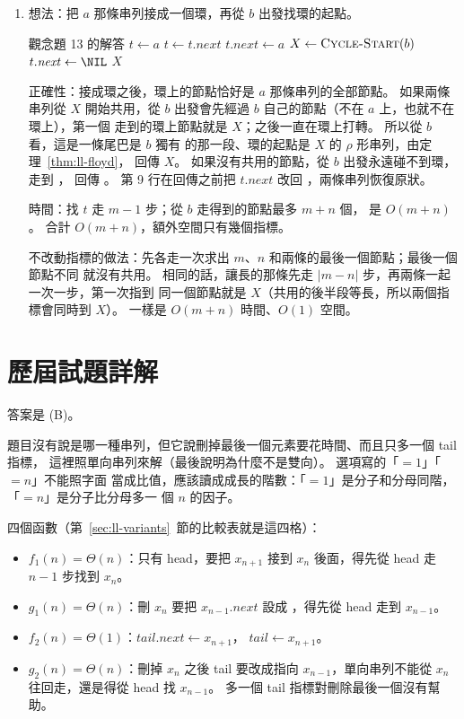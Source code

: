 \begin{enumerate}
\item 想法：把 $a$ 那條串列接成一個環，再從 $b$ 出發找環的起點。
\begin{pseudo}{觀念題 13 的解答}
        \State \Return \NIL
    \EndIf
    \State $t \gets a$
     
        \State $t \gets t.\mathit{next}$
    \EndWhile
    \State $t.\mathit{next} \gets a$ 
    \State $X \gets \Call{Cycle-Start}{b}$
    \State $t.\mathit{next} \gets \NIL$ 
    \State \Return $X$
\EndFunction
\end{pseudo}
正確性：接成環之後，環上的節點恰好是 $a$ 那條串列的全部節點。 如果兩條串列從 $X$
開始共用，從 $b$ 出發會先經過 $b$ 自己的節點（不在 $a$ 上，也就不在環上），第一個
走到的環上節點就是 $X$；之後一直在環上打轉。 所以從 $b$ 看，這是一條尾巴是 $b$ 獨有
的那一段、環的起點是 $X$ 的 $\rho$ 形串列，由定理~\ref{thm:ll-floyd}，
 回傳 $X$。 如果沒有共用的節點，從 $b$ 出發永遠碰不到環，走到
\NIL， 回傳 \NIL。 第 9 行在回傳之前把 $t.\mathit{next}$ 改回
\NIL，兩條串列恢復原狀。

時間：找 $t$ 走 $m - 1$ 步；從 $b$ 走得到的節點最多 $m + n$ 個，
是 $O(m + n)$。 合計 $O(m + n)$，額外空間只有幾個指標。

不改動指標的做法：先各走一次求出 $m$、$n$ 和兩條的最後一個節點；最後一個節點不同
就沒有共用。 相同的話，讓長的那條先走 $|m - n|$ 步，再兩條一起一次一步，第一次指到
同一個節點就是 $X$（共用的後半段等長，所以兩個指標會同時到 $X$）。 一樣是
$O(m + n)$ 時間、$O(1)$ 空間。
\end{enumerate}

\section*{歷屆試題詳解}

答案是 (B)。

題目沒有說是哪一種串列，但它說刪掉最後一個元素要花時間、而且只多一個 tail 指標，
這裡照單向串列來解（最後說明為什麼不是雙向）。 選項寫的「$= 1$」「$= n$」不能照字面
當成比值，應該讀成成長的階數：「$= 1$」是分子和分母同階，「$= n$」是分子比分母多一
個 $n$ 的因子。

四個函數（第~\ref{sec:ll-variants}~節的比較表就是這四格）：
\begin{itemize}
\item $f_1(n) = \Theta(n)$：只有 head，要把 $x_{n+1}$ 接到 $x_n$ 後面，得先從 head 走
$n - 1$ 步找到 $x_n$。
\item $g_1(n) = \Theta(n)$：刪 $x_n$ 要把 $x_{n-1}.\mathit{next}$ 設成 \NIL，得先從
head 走到 $x_{n-1}$。
\item $f_2(n) = \Theta(1)$：$\mathit{tail}.\mathit{next} \gets x_{n+1}$，
$\mathit{tail} \gets x_{n+1}$。
\item $g_2(n) = \Theta(n)$：刪掉 $x_n$ 之後 tail 要改成指向 $x_{n-1}$，單向串列不能從
$x_n$ 往回走，還是得從 head 找 $x_{n-1}$。 多一個 tail 指標對刪除最後一個沒有幫助。
\end{itemize}

